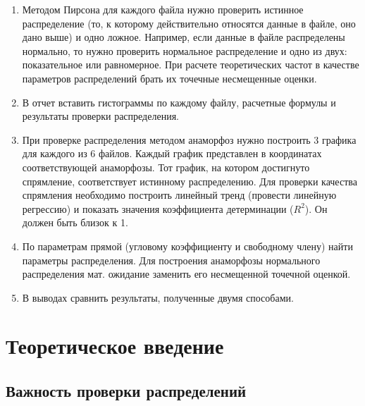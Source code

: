 \documentclass[
  14,
]{article}
\begin{document}
\begin{enumerate}
\def\labelenumi{\arabic{enumi}.}
\setcounter{enumi}{2}
\item
  Методом Пирсона для каждого файла нужно проверить истинное
  распределение (то, к которому действительно относятся данные в файле,
  оно дано выше) и одно ложное. Например, если данные в файле
  распределены нормально, то нужно проверить нормальное распределение и
  одно из двух: показательное или равномерное. При расчете теоретических
  частот в качестве параметров распределений брать их точечные
  несмещенные оценки.
\item
  В отчет вставить гистограммы по каждому файлу, расчетные формулы и
  результаты проверки распределения.
\item
  При проверке распределения методом анаморфоз нужно построить 3 графика
  для каждого из 6 файлов. Каждый график представлен в координатах
  соответствующей анаморфозы. Тот график, на котором достигнуто
  спрямление, соответствует истинному распределению. Для проверки
  качества спрямления необходимо построить линейный тренд (провести
  линейную регрессию) и показать значения коэффициента детерминации
  (\(R^2\)). Он должен быть близок к 1.
\item
  По параметрам прямой (угловому коэффициенту и свободному члену) найти
  параметры распределения. Для построения анаморфозы нормального
  распределения мат. ожидание заменить его несмещенной точечной оценкой.
\item
  В выводах сравнить результаты, полученные двумя способами.
\end{enumerate}

\hypertarget{ux442ux435ux43eux440ux435ux442ux438ux447ux435ux441ux43aux43eux435-ux432ux432ux435ux434ux435ux43dux438ux435}{%
\section{\texorpdfstring{\textbf{Теоретическое
введение}}{Теоретическое введение}}\label{ux442ux435ux43eux440ux435ux442ux438ux447ux435ux441ux43aux43eux435-ux432ux432ux435ux434ux435ux43dux438ux435}}

\hypertarget{ux432ux430ux436ux43dux43eux441ux442ux44c-ux43fux440ux43eux432ux435ux440ux43aux438-ux440ux430ux441ux43fux440ux435ux434ux435ux43bux435ux43dux438ux439}{%
\subsection{\texorpdfstring{\textbf{Важность проверки
распределений}}{Важность проверки распределений}}\label{ux432ux430ux436ux43dux43eux441ux442ux44c-ux43fux440ux43eux432ux435ux440ux43aux438-ux440ux430ux441ux43fux440ux435ux434ux435ux43bux435ux43dux438ux439}}
\end{document}
